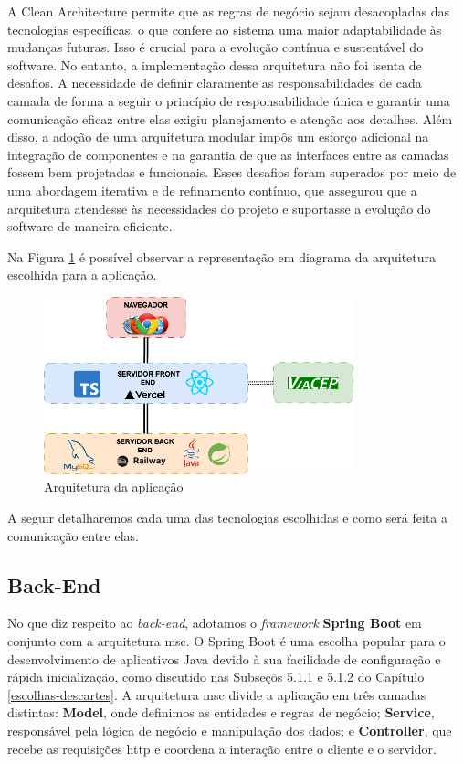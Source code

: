 A Clean Architecture permite que as regras de negócio sejam desacopladas das tecnologias específicas, o que confere ao sistema uma maior adaptabilidade às mudanças futuras. Isso é crucial para a evolução contínua e sustentável do software. No entanto, a implementação dessa arquitetura não foi isenta de desafios. A necessidade de definir claramente as responsabilidades de cada camada de forma a seguir o princípio de responsabilidade única e garantir uma comunicação eficaz entre elas exigiu planejamento e atenção aos detalhes. Além disso, a adoção de uma arquitetura modular impôs um esforço adicional na integração de componentes e na garantia de que as interfaces entre as camadas fossem bem projetadas e funcionais. Esses desafios foram superados por meio de uma abordagem iterativa e de refinamento contínuo, que assegurou que a arquitetura atendesse às necessidades do projeto e suportasse a evolução do software de maneira eficiente.


Na Figura \ref{arquitetura} é possível observar a representação em diagrama da arquitetura escolhida para a aplicação. 

\begin{figure}[ht]
        \centering
\includegraphics[width=0.8\textwidth]{images/EstruturaVocco(1).png}
        \caption{Arquitetura da aplicação}
        \label{arquitetura}
    \end{figure}

A seguir detalharemos cada uma das tecnologias escolhidas e como será feita a comunicação entre elas.

\subsection{Back-End}
No que diz respeito ao \textit{back-end}, adotamos o \textit{framework} \textbf{Spring Boot} em conjunto com a arquitetura \ac{msc}. O Spring Boot é uma escolha popular para o desenvolvimento de aplicativos Java devido à sua facilidade de configuração e rápida inicialização, como discutido nas Subseçõs 5.1.1 e 5.1.2 do Capítulo \ref{escolhas-descartes}. A arquitetura \ac{msc} divide a aplicação em três camadas distintas: \textbf{Model}, onde definimos as entidades e regras de negócio; \textbf{Service}, responsável pela lógica de negócio e manipulação dos dados; e \textbf{Controller}, que recebe as requisições \ac{http} e coordena a interação entre o cliente e o servidor. 

